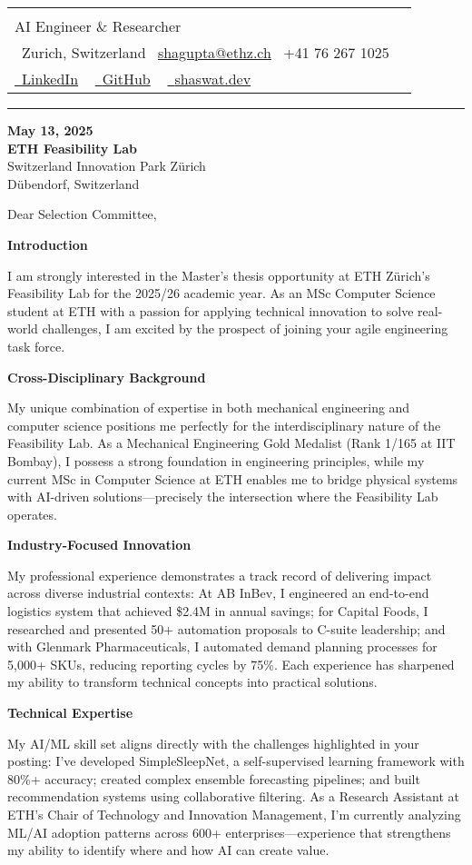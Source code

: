 \documentclass[letterpaper,10pt]{article}
\makeatletter
\newcommand{\icontext}[2]{\raisebox{-0.2\height}{#1}~#2}
\newcommand{\profileheader}{%
  \begin{profilebox}
    \begin{tabularx}{\textwidth}{@{}l@{\hspace{1.1cm}}X@{}}
      \fcolorbox{accentblue}{white}{
        \texttt{[image: shaswat.png]}
      }
      &
      \begin{minipage}[b]{\linewidth}
        {\Huge \textcolor{accentblue}{\scshape Shaswat Gupta}} \\[3pt]
        {\large \textcolor{mutedtext}{AI Engineer \& Researcher}} \\[6pt]
        \icontext{\faMapMarker}{\textcolor{mutedtext}{Zurich, Switzerland}} \quad
        \icontext{\faEnvelope}{\href{mailto:shagupta@ethz.ch}{\textcolor{accentblue}{shagupta@ethz.ch}}} \quad
        \icontext{\faPhone}{\textcolor{accentblue}{+41 76 267 1025}} \\[5pt]
        \href{https://linkedin.com/in/shaswat-gupta/}{\icontext{\faLinkedin}{\textcolor{accentblue}{LinkedIn}}} ~
        \href{https://github.com/Shaswat-G}{\icontext{\faGithub}{\textcolor{accentblue}{GitHub}}} ~
        \href{https://shaswat.dev}{\icontext{\faGlobe}{\textcolor{accentblue}{shaswat.dev}}}
      \end{minipage}
    \end{tabularx}
    \vspace{6pt}
    \hrule height 1.2pt \color{bordercolor}
  \end{profilebox}
}
\newcommand{\letterSection}[1]{%
    \vspace{8 pt}
  \begin{sectionbox}
    \color{accentblue}\scshape\raggedright\large\bfseries #1
  \end{sectionbox}
  \vspace{4 pt}
}
\makeatother
\begin{document}
\profileheader

{\color{mutedtext}
\textbf{May 13, 2025} \\[1pt]
\textbf{ETH Feasibility Lab} \\
Switzerland Innovation Park Zürich \\
Dübendorf, Switzerland
}

\vspace{12pt}

{\color{headercolor}
Dear Selection Committee,
}

\vspace{2pt}

\letterSection{Introduction}
I am strongly interested in the Master's thesis opportunity at ETH Zürich's Feasibility Lab for the 2025/26 academic year. As an MSc Computer Science student at ETH with a passion for applying technical innovation to solve real-world challenges, I am excited by the prospect of joining your agile engineering task force.

\letterSection{Cross-Disciplinary Background}
My unique combination of expertise in both mechanical engineering and computer science positions me perfectly for the interdisciplinary nature of the Feasibility Lab. As a Mechanical Engineering Gold Medalist (Rank 1/165 at IIT Bombay), I possess a strong foundation in engineering principles, while my current MSc in Computer Science at ETH enables me to bridge physical systems with AI-driven solutions—precisely the intersection where the Feasibility Lab operates.

\letterSection{Industry-Focused Innovation}
My professional experience demonstrates a track record of delivering impact across diverse industrial contexts: At AB InBev, I engineered an end-to-end logistics system that achieved \$2.4M in annual savings; for Capital Foods, I researched and presented 50+ automation proposals to C-suite leadership; and with Glenmark Pharmaceuticals, I automated demand planning processes for 5,000+ SKUs, reducing reporting cycles by 75\%. Each experience has sharpened my ability to transform technical concepts into practical solutions.

\letterSection{Technical Expertise}
My AI/ML skill set aligns directly with the challenges highlighted in your posting: I've developed SimpleSleepNet, a self-supervised learning framework with 80\%+ accuracy; created complex ensemble forecasting pipelines; and built recommendation systems using collaborative filtering. As a Research Assistant at ETH's Chair of Technology and Innovation Management, I'm currently analyzing ML/AI adoption patterns across 600+ enterprises—experience that strengthens my ability to identify where and how AI can create value.
\end{document}
